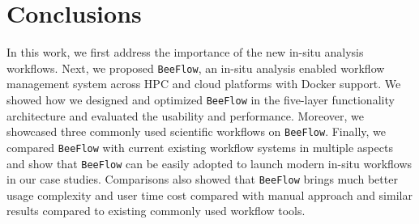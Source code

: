 \section{Conclusions}
In this work, we first address the importance of the new in-situ analysis workflows. Next, we proposed \texttt{BeeFlow}, an in-situ analysis enabled workflow management system across HPC and cloud platforms with Docker support. We showed how we designed and optimized \texttt{BeeFlow} in the five-layer functionality architecture and evaluated the usability and performance. Moreover, we showcased three commonly used scientific workflows on \texttt{BeeFlow}. Finally, we compared \texttt{BeeFlow} with current existing workflow systems in multiple aspects and show that \texttt{BeeFlow} can be easily adopted to launch modern in-situ workflows in our case studies. Comparisons also showed that \texttt{BeeFlow} brings much better usage complexity and user time cost compared with manual approach and similar results compared to existing commonly used workflow tools. 




